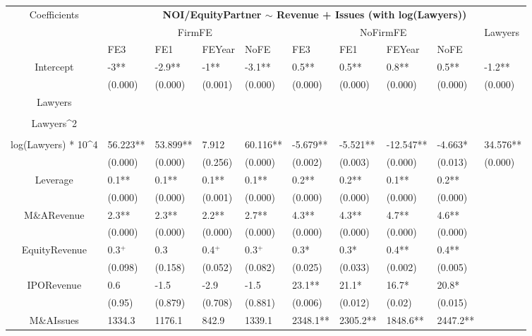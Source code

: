 \documentclass{article}
\begin{document}
\begin{table}[H]
\centering
\begin{tabular}{|clllllllll|}
\hline
\multirow{3}{*}{Coefficients} & \multicolumn{9}{c|}{\textbf{NOI/EquityPartner $\sim$ Revenue + Issues (with log(Lawyers))}} \\
\cline{2-10}
& \multicolumn{4}{c}{FirmFE} & \multicolumn{4}{c}{NoFirmFE} & \multirow{2}{*}{Lawyers} \\
\cline{2-9}
& FE3 & FE1 & FEYear & NoFE & FE3 & FE1 & FEYear & NoFE &  \\
\hline
 
Intercept & -3** & -2.9** & -1** & -3.1** & 0.5** & 0.5** & 0.8** & 0.5** & -1.2** \\ 
   & (0.000) & (0.000) & (0.001) & (0.000) & (0.000) & (0.000) & (0.000) & (0.000) & (0.000) \\ 
  Lawyers &  &  &  &  &  &  &  &  &  \\ 
   &  &  &  &  &  &  &  &  &  \\ 
  Lawyers^2 &  &  &  &  &  &  &  &  &  \\ 
   &  &  &  &  &  &  &  &  &  \\ 
  log(Lawyers) * 10^4 & 56.223** & 53.899** & 7.912 & 60.116** & -5.679** & -5.521** & -12.547** & -4.663* & 34.576** \\ 
   & (0.000) & (0.000) & (0.256) & (0.000) & (0.002) & (0.003) & (0.000) & (0.013) & (0.000) \\ 
  Leverage & 0.1** & 0.1** & 0.1** & 0.1** & 0.2** & 0.2** & 0.1** & 0.2** &  \\ 
   & (0.000) & (0.000) & (0.001) & (0.000) & (0.000) & (0.000) & (0.000) & (0.000) &  \\ 
  M\&ARevenue & 2.3** & 2.3** & 2.2** & 2.7** & 4.3** & 4.3** & 4.7** & 4.6** &  \\ 
   & (0.000) & (0.000) & (0.000) & (0.000) & (0.000) & (0.000) & (0.000) & (0.000) &  \\ 
  EquityRevenue & 0.3$^{+}$ & 0.3 & 0.4$^{+}$ & 0.3$^{+}$ & 0.3* & 0.3* & 0.4** & 0.4** &  \\ 
   & (0.098) & (0.158) & (0.052) & (0.082) & (0.025) & (0.033) & (0.002) & (0.005) &  \\ 
  IPORevenue & 0.6 & -1.5 & -2.9 & -1.5 & 23.1** & 21.1* & 16.7* & 20.8* &  \\ 
   & (0.95) & (0.879) & (0.708) & (0.881) & (0.006) & (0.012) & (0.02) & (0.015) &  \\ 
  M\&AIssues & 1334.3 & 1176.1 & 842.9 & 1339.1 & 2348.1** & 2305.2** & 1848.6** & 2447.2** &  \\ 

\end{tabular}
\end{table}
\end{document}
